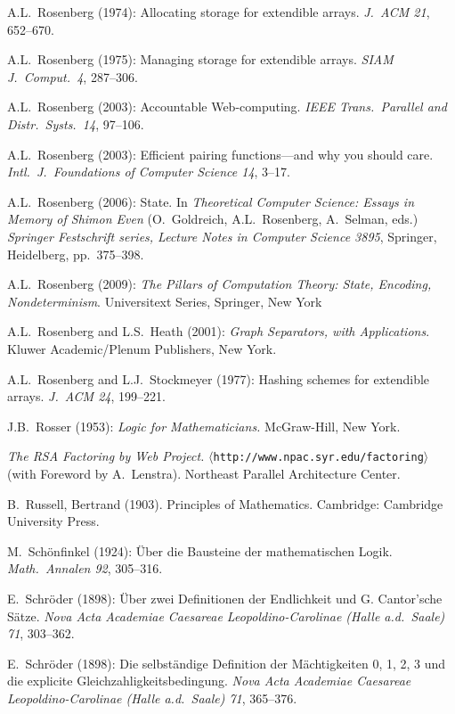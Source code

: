 \begin{thebibliography}{999}
A.L.~Rosenberg (1974): Allocating storage for extendible arrays.  {\it
J.~ACM 21}, 652--670.

A.L.~Rosenberg (1975): Managing storage for extendible arrays.  {\it
SIAM J.~Comput.~4}, 287--306.

A.L.~Rosenberg (2003): Accountable Web-computing.  {\it IEEE
Trans.~Parallel and Distr.~Systs.~14}, 97--106.

A.L.~Rosenberg (2003): Efficient pairing functions---and why you
should care.  {\it Intl.~J.~Foundations of Computer Science 14},
3--17.

A.L.~Rosenberg (2006): State.  In {\it Theoretical Computer Science:
Essays in Memory of Shimon Even} (O.~Goldreich, A.L.~Rosenberg,
A.~Selman, eds.)  {\it Springer Festschrift series, Lecture Notes in
Computer Science 3895}, Springer, Heidelberg, pp.~375--398.

A.L.~Rosenberg (2009):
{\it The Pillars of Computation Theory: State, Encoding,
  Nondeterminism}.
Universitext Series, Springer, New York 

A.L.~Rosenberg and L.S.~Heath (2001):
{\it Graph Separators, with Applications}.
Kluwer Academic/Plenum Publishers, New York.

A.L.~Rosenberg and L.J.~Stockmeyer (1977): Hashing schemes for
extendible arrays.  {\it J.~ACM 24}, 199--221.

J.B.~Rosser (1953):
{\it Logic for Mathematicians.}
McGraw-Hill, New York.

{\it The RSA Factoring by Web Project.}
$\langle${\tt http://www.npac.syr.edu/factoring}$\rangle$ (with
Foreword by A.~Lenstra).  Northeast Parallel Architecture Center.

B.~Russell, Bertrand (1903). Principles of Mathematics. Cambridge:
Cambridge University Press. 



M.~Sch\"onfinkel (1924): \"{U}ber die Bausteine der mathematischen
Logik.  {\it Math.~Annalen 92}, 305--316.

E.~Schr\"{o}der (1898): \"{U}ber zwei Definitionen der Endlichkeit und
G. Cantor'sche S\"{a}tze.  {\it Nova Acta Academiae Caesareae
Leopoldino-Carolinae (Halle a.d.~Saale) 71}, 303--362.

E.~Schr\"{o}der (1898): Die selbst\"{a}ndige Definition der
M\"{a}chtigkeiten 0, 1, 2, 3 und die explicite
Gleichzahligkeitsbedingung.  {\it Nova Acta Academiae Caesareae
Leopoldino-Carolinae (Halle a.d.~Saale) 71}, 365--376.


\end{thebibliography}
